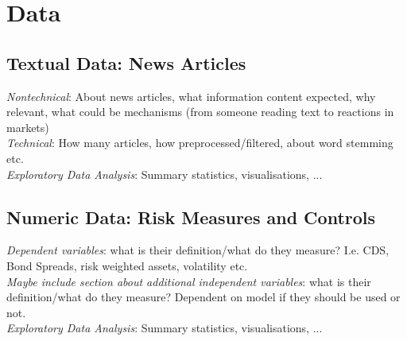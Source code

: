 \chapter{Data}\label{sec4}
\thispagestyle{empty}

\section{Textual Data: News Articles}

\textit{Nontechnical}: About news articles, what information content expected, why relevant, what could be mechanisms (from someone reading text to reactions in markets) \\

\noindent
\textit{Technical}: How many articles, how preprocessed/filtered, about word stemming etc. \\

\noindent
\textit{Exploratory Data Analysis}: Summary statistics, visualisations, ... \\

\section{Numeric Data: Risk Measures and Controls}

\textit{Dependent variables}: what is their definition/what do they measure? I.e. CDS, Bond Spreads, risk weighted assets, volatility etc. \\

\noindent
\textit{Maybe include section about additional independent variables}: what is their definition/what do they measure? Dependent on model if they should be used or not. \\

\noindent
\textit{Exploratory Data Analysis}: Summary statistics, visualisations, ... \\

\cleardoublepage
